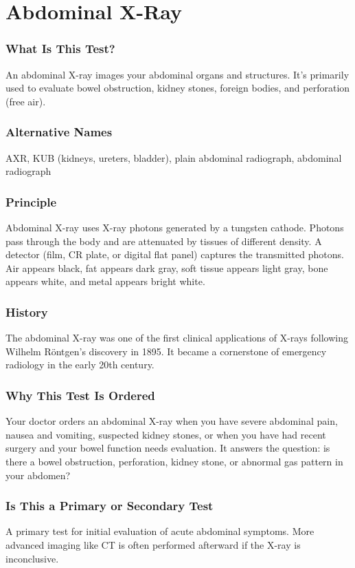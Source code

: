 \section{Abdominal X-Ray}


\subsubsection*{What Is This Test?}
An abdominal X-ray images your abdominal organs and structures. It's primarily used to evaluate bowel obstruction, kidney stones, foreign bodies, and perforation (free air).

\subsubsection*{Alternative Names}
AXR, KUB (kidneys, ureters, bladder), plain abdominal radiograph, abdominal radiograph


\subsubsection*{Principle}
Abdominal X-ray uses X-ray photons generated by a tungsten cathode. Photons pass through the body and are attenuated by tissues of different density. A detector (film, CR plate, or digital flat panel) captures the transmitted photons. Air appears black, fat appears dark gray, soft tissue appears light gray, bone appears white, and metal appears bright white.

\subsubsection*{History}
The abdominal X-ray was one of the first clinical applications of X-rays following Wilhelm Röntgen's discovery in 1895. It became a cornerstone of emergency radiology in the early 20th century.

\subsubsection*{Why This Test Is Ordered}
Your doctor orders an abdominal X-ray when you have severe abdominal pain, nausea and vomiting, suspected kidney stones, or when you have had recent surgery and your bowel function needs evaluation. It answers the question: is there a bowel obstruction, perforation, kidney stone, or abnormal gas pattern in your abdomen?

\subsubsection*{Is This a Primary or Secondary Test}
A primary test for initial evaluation of acute abdominal symptoms. More advanced imaging like CT is often performed afterward if the X-ray is inconclusive.


